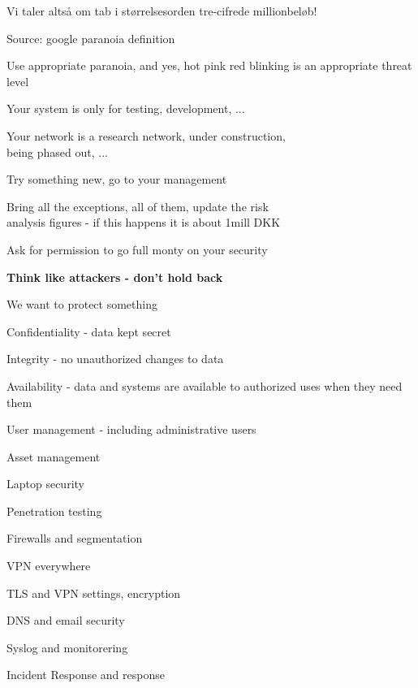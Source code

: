 \documentclass[Screen16to9,17pt]{foils}
\begin{document}
\begin{list2}
\item Vi taler altså om tab i størrelsesorden tre-cifrede millionbeløb!
\end{list2}



Source: google paranoia definition

Use appropriate paranoia, and yes, hot pink red blinking is an appropriate threat level



Your system is only for testing, development, ...

Your network is a research network, under construction, \\
being phased out, ...

Try something new, go to your management

Bring all the exceptions, all of them, update the risk \\
analysis figures - if this happens it is about 1mill DKK

Ask for permission to go full monty on your security

{\bf Think like attackers - don't hold back}




\begin{list1}
\item We want to protect something
\item Confidentiality - data kept secret
\item Integrity - no unauthorized changes to data
\item Availability - data and systems are available to authorized uses when they need them
\end{list1}



\begin{list2}
\item User management - including administrative users
\item Asset management
\item Laptop security
\item Penetration testing
\item Firewalls and segmentation
\item VPN everywhere
\item TLS and VPN settings, encryption
\item DNS and email security
\item Syslog and monitorering
\item Incident Response and response
\end{list2}
\end{document}
